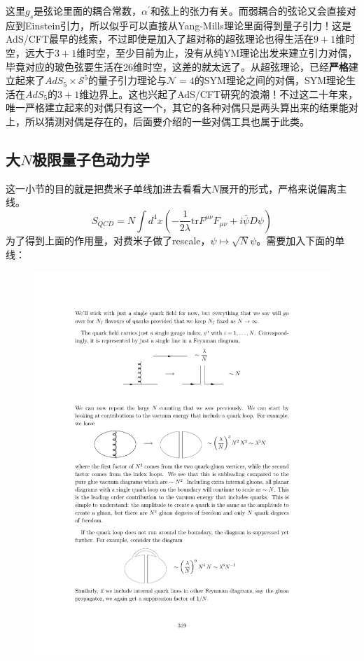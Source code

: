 这里$g_s$是弦论里面的耦合常数，$\alpha^\prime$和弦上的张力有关。而弱耦合的弦论又会直接对应到Einstein引力，所以似乎可以直接从Yang-Mills理论里面得到量子引力！这是AdS/CFT最早的线索，不过即使是加入了超对称的超弦理论也得生活在$9+1$维时空，远大于$3+1$维时空，至少目前为止，没有从纯YM理论出发来建立引力对偶，毕竟对应的玻色弦要生活在26维时空，这差的就太远了。从超弦理论，已经\textbf{严格}建立起来了$AdS_{5}\times\mathcal{S}^5$的量子引力理论与$\mathcal{N}=4$的SYM理论之间的对偶，SYM理论生活在$AdS_5$的$3+1$维边界上。这也兴起了AdS/CFT研究的浪潮！不过这二十年来，唯一严格建立起来的对偶只有这一个，其它的各种对偶只是两头算出来的结果能对上，所以猜测对偶是存在的，后面要介绍的一些对偶工具也属于此类。

\subsection{大$N$极限量子色动力学}这一小节的目的就是把费米子单线加进去看看大$N$展开的形式，严格来说偏离主线。
\begin{equation}
	S_{QCD}=N\int d^4x\left(-\frac{1}{2\lambda}\mathrm{tr}F^{\mu\nu}F_{\mu\nu}+i\bar{\psi}D\psi \right)
\end{equation}
为了得到上面的作用量，对费米子做了rescale，$\psi\mapsto\sqrt{N}\psi$。需要加入下面的单线：
\begin{figure}[H]
	\centering
	\includegraphics{figs/fig18.pdf}
\end{figure}
